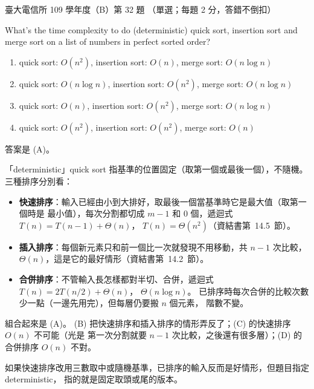 \begin{pastexam}[label={px:ntu-109-comm-dsa-32}]{臺大電信所 109 學年度（B）第 32 題}
（單選；每題 2 分，答錯不倒扣）

What's the time complexity to do (deterministic) quick sort, insertion sort and merge sort on a list
of numbers in perfect sorted order?
\begin{enumerate}[label=(\Alph*)]
\item quick sort: $O(n^2)$, insertion sort: $O(n)$, merge sort: $O(n\log n)$
\item quick sort: $O(n\log n)$, insertion sort: $O(n^2)$, merge sort: $O(n\log n)$
\item quick sort: $O(n)$, insertion sort: $O(n^2)$, merge sort: $O(n\log n)$
\item quick sort: $O(n^2)$, insertion sort: $O(n^2)$, merge sort: $O(n)$
\end{enumerate}
\end{pastexam}

\begin{pastsoln}
答案是 (A)。

「deterministic」quick sort 指基準的位置固定（取第一個或最後一個），不隨機。 三種排序分別看：
\begin{itemize}
\item \textbf{快速排序}：輸入已經由小到大排好，取最後一個當基準時它是最大值（取第一個時是
最小值），每次分割都切成 $m - 1$ 和 $0$ 個，遞迴式 $T(n) = T(n - 1) + \Theta(n)$，
$T(n) = \Theta(n^2)$（資結書第~14.5~節）。
\item \textbf{插入排序}：每個新元素只和前一個比一次就發現不用移動，共 $n - 1$ 次比較，
$\Theta(n)$，這是它的最好情形（資結書第~14.2~節）。
\item \textbf{合併排序}：不管輸入長怎樣都對半切、合併，遞迴式 $T(n) = 2T(n/2) + \Theta(n)$，
$\Theta(n \log n)$。 已排序時每次合併的比較次數少一點（一邊先用完），但每層仍要搬 $n$ 個元素，
階數不變。
\end{itemize}
組合起來是 (A)。 (B) 把快速排序和插入排序的情形弄反了；(C) 的快速排序 $O(n)$ 不可能（光是
第一次分割就要 $n - 1$ 次比較，之後還有很多層）；(D) 的合併排序 $O(n)$ 不對。

如果快速排序改用三數取中或隨機基準，已排序的輸入反而是好情形，但題目指定 deterministic，
指的就是固定取頭或尾的版本。
\end{pastsoln}
